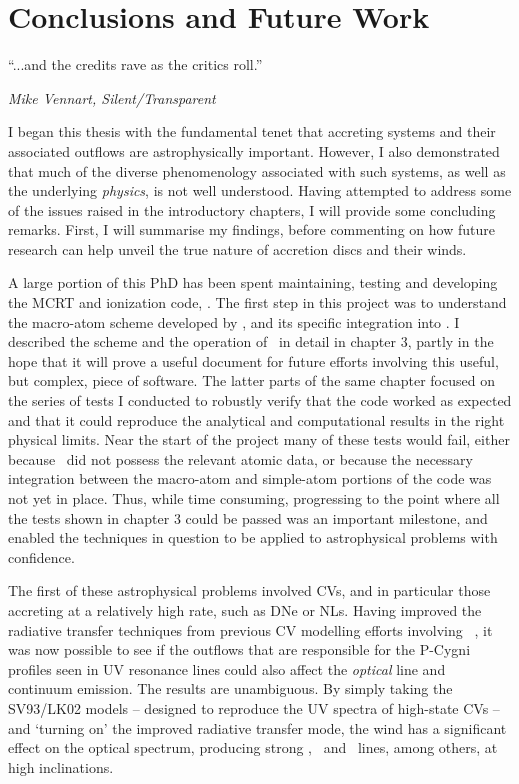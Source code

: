 \chapter{Conclusions and Future Work}

\epigraph{``...and the credits rave as the critics roll.''}
{{\sl Mike Vennart, Silent/Transparent}}

I began this thesis with the fundamental tenet that accreting systems
and their associated outflows are astrophysically important. However, I also
demonstrated that much of the diverse phenomenology associated with such systems, as well
as the underlying {\em physics}, is not well understood.  
Having attempted to address some of the issues raised in the 
introductory chapters, I will provide some concluding remarks. 
First, I will summarise my findings, before 
commenting on how future research can help unveil the true nature of 
accretion discs and their winds.

A large portion of this PhD has been spent maintaining,
testing and developing the MCRT and ionization code, \py. The first 
step in this project was to understand the macro-atom scheme
developed by \cite{lucy2002,lucy2003}, and its specific integration
into \py. I described the scheme and the operation of \py\ in detail
in chapter 3, partly in the hope that it will prove a useful document
for future efforts involving this useful, but complex, piece of software.
The latter parts of the same chapter focused on the series of tests
I conducted to robustly verify that the code worked as expected and that 
it could reproduce the analytical and computational results in the 
right physical limits. Near the start of the project many of these tests
would fail, either because \py\ did not possess the relevant atomic data,
or because the necessary integration between the macro-atom and simple-atom
portions of the code was not yet in place. Thus, while time consuming,
progressing to the point where all the tests shown in chapter 3 could be
passed was an important milestone, and enabled the techniques in question
to be applied to astrophysical problems with confidence.

The first of these astrophysical problems involved CVs, and in particular
those accreting at a relatively high rate, such as DNe or NLs. Having 
improved the radiative transfer techniques from previous CV modelling efforts
involving \py\ \citep[LK02, ][]{noebauer}, it was now possible to see
if the outflows that are responsible for the P-Cygni profiles seen
in UV resonance lines could also affect the {\em optical} line and continuum
emission. The results are unambiguous. By simply taking the SV93/LK02
models -- designed to reproduce the UV spectra of high-state CVs --
and `turning on' the improved radiative transfer mode, the wind
has a significant effect on the optical spectrum, producing strong
\ha, \heiiopt\ and \heiioptnew\ lines, among others, at high inclinations.

